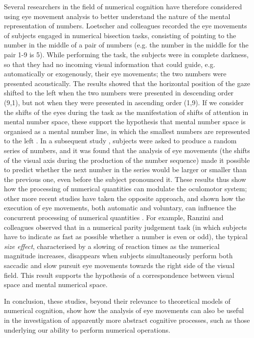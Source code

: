 \documentclass[11pt]{article}
\begin{document}
Several researchers in the field of numerical cognition have therefore considered using eye movement analysis to better understand the nature of the mental representation of numbers. Loetscher and colleagues \cite{Loetscher2008} recorded the eye movements of subjects engaged in numerical bisection tasks, consisting of pointing to the number in the middle of a pair of numbers (e.g. the number in the middle for the pair 1-9 is 5). While performing the task, the subjects were in complete darkness, so that they had no incoming visual information that could guide, e.g. automatically or exogenously, their eye movements; the two numbers were presented acoustically. The results showed that the horizontal position of the gaze shifted to the left when the two numbers were presented in descending order (9,1), but not when they were presented in ascending order (1,9). If we consider the shifts of the eyes during the task as the manifestation of shifts of attention in mental number space, these support the hypothesis that mental number space is organised as a mental number line, in which the smallest numbers are represented to the left \cite{Zorzi2002}. In a subsequent study \cite{Loetscher2010}, subjects were asked to produce a random series of numbers, and it was found that the analysis of eye movements (the shifts of the visual axis during the production of the number sequence) made it possible to predict whether the next number in the series would be larger or smaller than the previous one, even before the subject pronounced it. These results thus show how the processing of numerical quantities can modulate the oculomotor system; other more recent studies have taken the opposite approach, and shown how the execution of eye movements, both automatic and voluntary, can influence the concurrent processing of numerical quantities \cite{Ranzini2015,Ranzini2016}. For example, Ranzini and colleagues observed that in a numerical parity judgement task (in which subjects have to indicate as fast as possible whether a number is even or odd), the typical \textit{size effect}, characterised by a slowing of reaction times as the numerical magnitude increases, disappears when subjects simultaneously perform both saccadic and slow pursuit eye movements towards the right side of the visual field. This result supports the hypothesis of a correspondence between visual space and mental numerical space.

In conclusion, these studies, beyond their relevance to theoretical models of numerical cognition, show how the analysis of eye movements can also be useful in the investigation of apparently more abstract cognitive processes, such as those underlying our ability to perform numerical operations.
\end{document}
